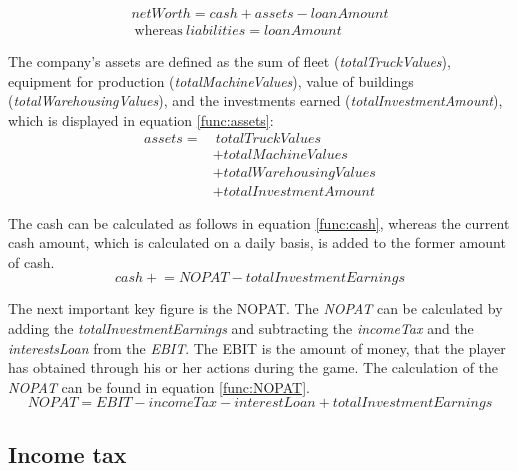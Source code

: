 \begin{equation}
\label{func:netWorth}
\begin{split}
    netWorth = cash + assets - loanAmount \\ ~\text{whereas}~liabilities = loanAmount
    \end{split}
\end{equation}

The company's assets are defined as the sum of fleet (\textit{totalTruckValues}), equipment for production (\textit{totalMachineValues}), value of buildings (\textit{totalWarehousingValues}), and the investments earned (\textit{totalInvestmentAmount}), which is displayed in equation \ref{func:assets}:
\begin{equation}
    \label{func:assets}
    \begin{aligned}
        assets = & ~totalTruckValues \\
        &+ totalMachineValues \\ 
        &+ totalWarehousingValues \\
        &+ totalInvestmentAmount
    \end{aligned}
\end{equation}

The cash can be calculated as follows in equation \ref{func:cash}, whereas the current cash amount, which is calculated on a daily basis, is added to the former amount of cash.
\begin{equation}
    \label{func:cash}
    cash \mathrel{+}= NOPAT - totalInvestmentEarnings %
\end{equation}

The next important key figure is the \gls{NOPAT}. The \textit{NOPAT} can be calculated by adding the \textit{totalInvestmentEarnings} and subtracting the \textit{incomeTax} and the \textit{interestsLoan} from the \textit{EBIT}. The \gls{EBIT} is the amount of money, that the player has obtained through his or her actions during the game. The calculation of the \textit{NOPAT} can be found in equation \ref{func:NOPAT}.
\begin{equation}
    \label{func:NOPAT}
    NOPAT = EBIT - incomeTax - interestLoan + totalInvestmentEarnings
\end{equation}
 
\subsection{Income tax}
\label{sec:incomeTax}

